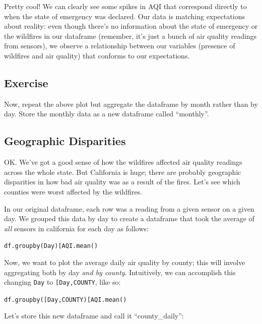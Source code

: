 \documentclass[
  letterpaper,
  DIV=11,
  numbers=noendperiod]{scrreprt}
\begin{document}
Pretty cool! We can clearly see some spikes in AQI that correspond
directly to when the state of emergency was declared. Our data is
matching expectations about reality: even though there's no information
about the state of emergency or the wildfires in our dataframe
(remember, it's just a bunch of air quality readings from sensors), we
observe a relationship between our variables (presence of wildfires and
air quality) that conforms to our expectations.

\hypertarget{exercise-4}{%
\subsection{Exercise}\label{exercise-4}}

Now, repeat the above plot but aggregate the dataframe by month rather
than by day. Store the monthly data as a new dataframe called
``monthly''.

\hypertarget{geographic-disparities}{%
\subsection{Geographic Disparities}\label{geographic-disparities}}

OK. We've got a good sense of how the wildfires affected air quality
readings across the whole state. But California is huge; there are
probably geographic disparities in how bad air quality was as a result
of the fires. Let's see which counties were worst affected by the
wildfires.

In our original dataframe, each row was a reading from a given sensor on
a given day. We grouped this data by day to create a dataframe that took
the average of \emph{all} sensors in california for each day as follows:

\texttt{df.groupby(\textquotesingle{}Day\textquotesingle{}){[}\textquotesingle{}AQI\textquotesingle{}{]}.mean()}

Now, we want to plot the average daily air quality by county; this will
involve aggregating both by day \emph{and by county}. Intuitively, we
can accomplish this changing
\texttt{\textquotesingle{}Day\textquotesingle{}} to
\texttt{{[}\textquotesingle{}Day\textquotesingle{},\textquotesingle{}COUNTY\textquotesingle{}{]}},
like so:

\texttt{df.groupby({[}\textquotesingle{}Day\textquotesingle{},\textquotesingle{}COUNTY\textquotesingle{}{]}){[}\textquotesingle{}AQI\textquotesingle{}{]}.mean()}

Let's store this new dataframe and call it ``county\_daily'':
\end{document}
